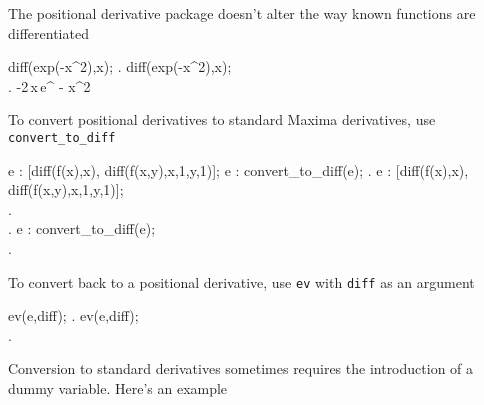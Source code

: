 The positional derivative package doesn't alter the way known functions
are differentiated

\beginmaximasession
diff(exp(-x^2),x);
\maximatexsession
{}.  diff(exp(-x^2),x); \\
.  -2\,x\,e^ {- x^2 } \\
\endmaximasession

\noindent To convert positional derivatives to standard Maxima derivatives,
use {\tt convert\_to\_diff}

\beginmaximasession
e : [diff(f(x),x), diff(f(x,y),x,1,y,1)];
e : convert_to_diff(e);
\maximatexsession
{}.  e : [diff(f(x),x), diff(f(x,y),x,1,y,1)]; \\
.   \\
.  e : convert_to_diff(e); \\
.   \\
\endmaximasession

\noindent To convert back to a positional derivative, use {\tt ev} with {\tt diff} as an argument

\beginmaximasession
ev(e,diff);
\maximatexsession
{}.  ev(e,diff); \\
.   \\
\endmaximasession

\noindent Conversion to standard derivatives  sometimes requires the 
introduction of  a dummy variable. Here's an example

